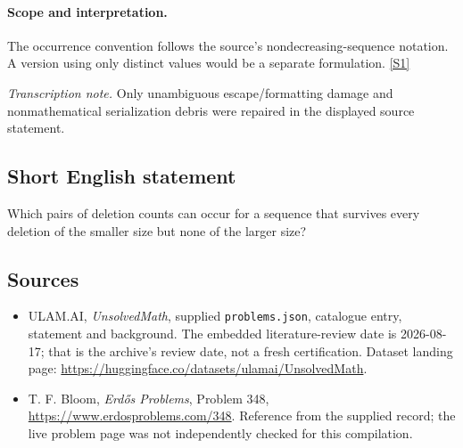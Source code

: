 \documentclass[11pt,a4paper]{article}
\newcommand{\sref}[2]{\hyperlink{source:#1:#2}{[S#2]}}
\begin{document}
\paragraph{Scope and interpretation.}

The occurrence convention follows the source’s nondecreasing-sequence notation. A version using only distinct values would be a separate formulation. \sref{statement}{1}

{\small\emph{Transcription note.} Only unambiguous escape/formatting damage and nonmathematical serialization debris were repaired in the displayed source statement.}

\subsection{Short English statement}

Which pairs of deletion counts can occur for a sequence that survives every deletion of the smaller size but none of the larger size?

\subsection{Sources}

{\small

\begin{itemize}

\item[\hypertarget{source:statement:1}{S1}] ULAM.AI, \emph{UnsolvedMath}, supplied \texttt{problems.json}, catalogue entry, statement and background. The embedded literature-review date is 2026-08-17; that is the archive’s review date, not a fresh certification. Dataset landing page: \url{https://huggingface.co/datasets/ulamai/UnsolvedMath}.

\item[\hypertarget{source:statement:2}{S2}] T. F. Bloom, \emph{Erdős Problems}, Problem 348, \url{https://www.erdosproblems.com/348}. Reference from the supplied record; the live problem page was not independently checked for this compilation.

\end{itemize}

}

\label{end:statement}
\end{document}
